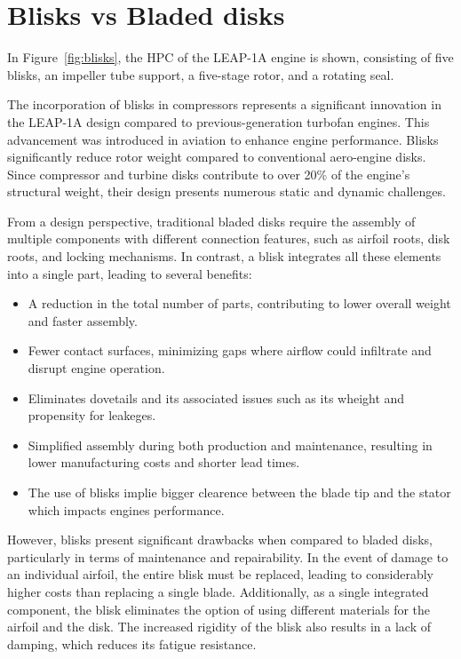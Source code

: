 \section{Blisks vs Bladed disks}
\label{sec: blisks_disks}

In Figure~\ref{fig:blisks}, the \gls{HPC} of the \gls{LEAP}-1A engine is shown, consisting of five blisks, an impeller tube support, a five-stage rotor, and a rotating seal.

The incorporation of blisks in compressors represents a significant innovation in the \gls{LEAP}-1A design compared to previous-generation turbofan engines. This advancement was introduced in aviation to enhance engine performance. Blisks significantly reduce rotor weight compared to conventional aero-engine disks. Since compressor and turbine disks contribute to over 20\% of the engine's structural weight, their design presents numerous static and dynamic challenges.

From a design perspective, traditional bladed disks require the assembly of multiple components with different connection features, such as airfoil roots, disk roots, and locking mechanisms. In contrast, a blisk integrates all these elements into a single part, leading to several benefits:
\begin{itemize}
    \item A reduction in the total number of parts, contributing to lower overall weight and faster assembly.
    \item Fewer contact surfaces, minimizing gaps where airflow could infiltrate and disrupt engine operation.
    \item Eliminates dovetails and its associated issues such as its wheight and propensity for leakeges.
    \item Simplified assembly during both production and maintenance, resulting in lower manufacturing costs and shorter lead times.
    \item The use of blisks implie bigger clearence between the blade tip and the stator which impacts engines performance. 
\end{itemize}
However, blisks present significant drawbacks when compared to bladed disks, particularly in terms of maintenance and repairability. In the event of damage to an individual airfoil, the entire blisk must be replaced, leading to considerably higher costs than replacing a single blade. Additionally, as a single integrated component, the blisk eliminates the option of using different materials for the airfoil and the disk. The increased rigidity of the blisk also results in a lack of damping, which reduces its fatigue resistance.

